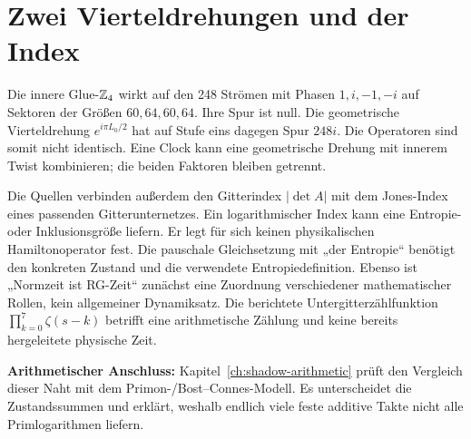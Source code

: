 \section{Zwei Vierteldrehungen und der Index}
Die innere Glue-$\mathbb Z_4$ wirkt auf den 248 Strömen mit Phasen $1,i,-1,-i$ auf Sektoren der Größen $60,64,60,64$. Ihre Spur ist null. Die geometrische Vierteldrehung $e^{i\pi L_0/2}$ hat auf Stufe eins dagegen Spur $248i$. Die Operatoren sind somit nicht identisch. Eine Clock kann eine geometrische Drehung mit innerem Twist kombinieren; die beiden Faktoren bleiben getrennt. 

Die Quellen verbinden außerdem den Gitterindex $|\det A|$ mit dem Jones-Index eines passenden Gitterunternetzes. Ein logarithmischer Index kann eine Entropie- oder Inklusionsgröße liefern. Er legt für sich keinen physikalischen Hamiltonoperator fest. Die pauschale Gleichsetzung mit „der Entropie“ benötigt den konkreten Zustand und die verwendete Entropiedefinition. Ebenso ist „Normzeit ist RG-Zeit“ zunächst eine Zuordnung verschiedener mathematischer Rollen, kein allgemeiner Dynamiksatz. Die berichtete Untergitterzählfunktion $\prod_{k=0}^7\zeta(s-k)$ betrifft eine arithmetische Zählung und keine bereits hergeleitete physische Zeit.

\par\noindent\textbf{Arithmetischer Anschluss:} Kapitel~\ref{ch:shadow-arithmetic} prüft den Vergleich dieser Naht mit dem Primon-/Bost--Connes-Modell. Es unterscheidet die Zustandssummen und erklärt, weshalb endlich viele feste additive Takte nicht alle Primlogarithmen liefern.
